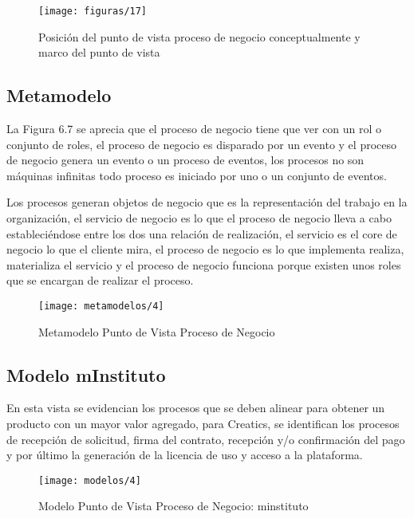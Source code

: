   \begin{figure}[H]
  	\centering
  	\texttt{[image: figuras/17]}
  	\captionsetup{width=.95\textwidth}
  	\caption{Posición del punto de vista proceso de negocio conceptualmente y marco del punto de vista}
  	\label{figura17}
  \end{figure}
  
  \subsection{Metamodelo}
  La Figura 6.7 se aprecia que el proceso de negocio tiene que ver con un rol o conjunto de roles, el proceso de negocio es disparado por un evento y el proceso de negocio genera un evento o un proceso de eventos, los procesos no son máquinas infinitas todo proceso es
  iniciado por uno o un conjunto de eventos.
  
  Los procesos generan objetos de negocio que es la representación del trabajo en la organización,  el servicio de negocio es lo que el proceso de negocio lleva a cabo estableciéndose entre los dos una relación de realización, el servicio es el core de negocio lo que el cliente mira, el proceso de negocio es lo que implementa realiza, materializa el servicio y el proceso de negocio funciona porque existen unos roles que se encargan de realizar el proceso.
  
  \begin{figure}[H]
  	\centering
  	\texttt{[image: metamodelos/4]}
  	\captionsetup{width=.95\textwidth}
  	\caption{Metamodelo Punto de Vista Proceso de Negocio}
  	\label{metamodelo4}
  \end{figure}
  
  \subsection{Modelo mInstituto}
  En esta vista se evidencian los procesos que se deben alinear para obtener un producto con un mayor valor agregado, para Creatics, se identifican los procesos de recepción de solicitud, firma del contrato, recepción y/o confirmación del pago y por último la generación de la licencia de uso y acceso a la plataforma.
  
  \begin{figure}[H]
  	\centering
  	\texttt{[image: modelos/4]}
  	\captionsetup{width=.95\textwidth}
  	\caption{Modelo Punto de Vista Proceso de Negocio: minstituto}
  	\label{modelo4}
  \end{figure}
  

